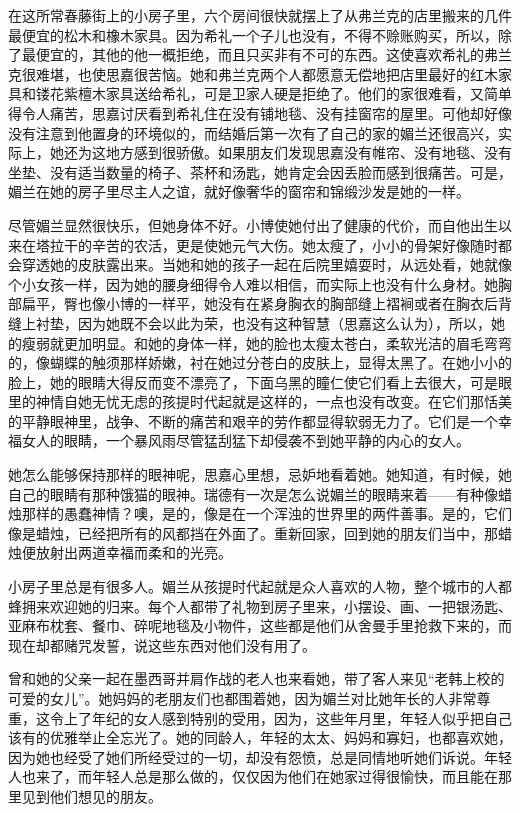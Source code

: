 \par 在这所常春藤街上的小房子里，六个房间很快就摆上了从弗兰克的店里搬来的几件最便宜的松木和橡木家具。因为希礼一个子儿也没有，不得不赊账购买，所以，除了最便宜的，其他的他一概拒绝，而且只买非有不可的东西。这使喜欢希礼的弗兰克很难堪，也使思嘉很苦恼。她和弗兰克两个人都愿意无偿地把店里最好的红木家具和镂花紫檀木家具送给希礼，可是卫家人硬是拒绝了。他们的家很难看，又简单得令人痛苦，思嘉讨厌看到希礼住在没有铺地毯、没有挂窗帘的屋里。可他却好像没有注意到他置身的环境似的，而结婚后第一次有了自己的家的媚兰还很高兴，实际上，她还为这地方感到很骄傲。如果朋友们发现思嘉没有帷帘、没有地毯、没有坐垫、没有适当数量的椅子、茶杯和汤匙，她肯定会因丢脸而感到很痛苦。可是，媚兰在她的房子里尽主人之谊，就好像奢华的窗帘和锦缎沙发是她的一样。
\par 尽管媚兰显然很快乐，但她身体不好。小博使她付出了健康的代价，而自他出生以来在塔拉干的辛苦的农活，更是使她元气大伤。她太瘦了，小小的骨架好像随时都会穿透她的皮肤露出来。当她和她的孩子一起在后院里嬉耍时，从远处看，她就像个小女孩一样，因为她的腰身细得令人难以相信，而实际上也没有什么身材。她胸部扁平，臀也像小博的一样平，她没有在紧身胸衣的胸部缝上褶裥或者在胸衣后背缝上衬垫，因为她既不会以此为荣，也没有这种智慧（思嘉这么认为），所以，她的瘦弱就更加明显。和她的身体一样，她的脸也太瘦太苍白，柔软光洁的眉毛弯弯的，像蝴蝶的触须那样娇嫩，衬在她过分苍白的皮肤上，显得太黑了。在她小小的脸上，她的眼睛大得反而变不漂亮了，下面乌黑的瞳仁使它们看上去很大，可是眼里的神情自她无忧无虑的孩提时代起就是这样的，一点也没有改变。在它们那恬美的平静眼神里，战争、不断的痛苦和艰辛的劳作都显得软弱无力了。它们是一个幸福女人的眼睛，一个暴风雨尽管猛刮猛下却侵袭不到她平静的内心的女人。
\par 她怎么能够保持那样的眼神呢，思嘉心里想，忌妒地看着她。她知道，有时候，她自己的眼睛有那种饿猫的眼神。瑞德有一次是怎么说媚兰的眼睛来着——有种像蜡烛那样的愚蠢神情？噢，是的，像是在一个浑浊的世界里的两件善事。是的，它们像是蜡烛，已经把所有的风都挡在外面了。重新回家，回到她的朋友们当中，那蜡烛便放射出两道幸福而柔和的光亮。
\par 小房子里总是有很多人。媚兰从孩提时代起就是众人喜欢的人物，整个城市的人都蜂拥来欢迎她的归来。每个人都带了礼物到房子里来，小摆设、画、一把银汤匙、亚麻布枕套、餐巾、碎呢地毯及小物件，这些都是他们从舍曼手里抢救下来的，而现在却都赌咒发誓，说这些东西对他们没有用了。
\par 曾和她的父亲一起在墨西哥并肩作战的老人也来看她，带了客人来见“老韩上校的可爱的女儿”。她妈妈的老朋友们也都围着她，因为媚兰对比她年长的人非常尊重，这令上了年纪的女人感到特别的受用，因为，这些年月里，年轻人似乎把自己该有的优雅举止全忘光了。她的同龄人，年轻的太太、妈妈和寡妇，也都喜欢她，因为她也经受了她们所经受过的一切，却没有怨愤，总是同情地听她们诉说。年轻人也来了，而年轻人总是那么做的，仅仅因为他们在她家过得很愉快，而且能在那里见到他们想见的朋友。
